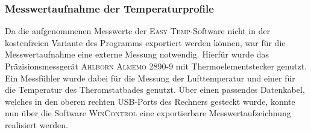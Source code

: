 \subsubsection*{Messwertaufnahme der Temperaturprofile}
Da die aufgenommenen Messwerte der \textsc{Easy Temp}-Software nicht in der kostenfreien Variante des Programms exportiert werden können, war für die Messwertaufnahme eine externe Messung notwendig. Hierfür wurde das Präzisionsmessgerät \textsc{Ahlborn Almemo 2890-9} mit Thermoelementstecker genutzt. Ein Messfühler wurde dabei für die Messung der Lufttemperatur und einer für die Temperatur des Theromstatbades genutzt. Über einen passendes Datenkabel, welches in den oberen rechten USB-Ports des Rechners gesteckt wurde, konnte nun über die Software \textsc{WinControl} eine exportierbare Messwertaufzeichnung realisiert werden.
%

